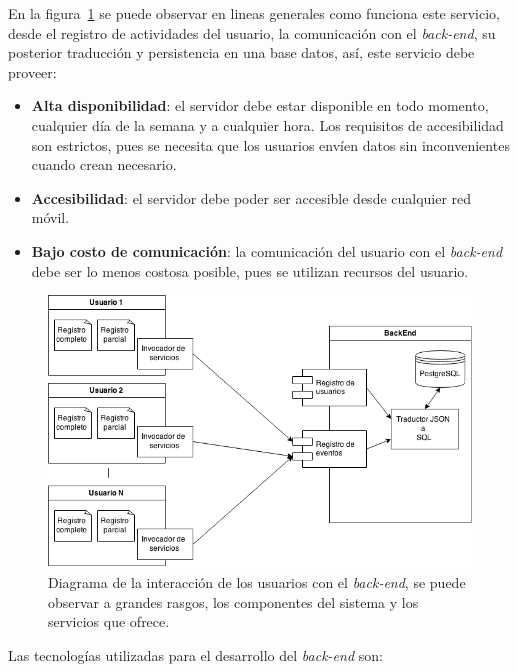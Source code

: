 En la figura~\ref{fig:backend_diagrama} se puede observar en lineas generales
como funciona este servicio, desde el registro de actividades del usuario, la
comunicación con el \textit{back-end}, su posterior traducción y persistencia en
una base datos, así, este servicio debe proveer:

\begin{itemize}
    \item \textbf{Alta disponibilidad}: el servidor debe estar disponible en
        todo momento, cualquier día de la semana y a cualquier hora. Los
        requisitos de accesibilidad son estrictos, pues se necesita que los
        usuarios envíen datos sin inconvenientes cuando crean necesario.
    \item \textbf{Accesibilidad}: el servidor debe poder ser accesible desde
        cualquier red móvil.
    \item \textbf{Bajo costo de comunicación}: la comunicación del usuario con
        el \textit{back-end} debe ser lo menos costosa posible, pues se utilizan
        recursos del usuario.
\end{itemize}

\begin{figure}[H]
\centering
\includegraphics[scale=0.5]{tecnologias/images/backend_diagrama.png}
\caption{Diagrama de la interacción de los usuarios con el \textit{back-end}, se
    puede observar a grandes rasgos, los componentes del sistema y los servicios
    que ofrece.}
\label{fig:backend_diagrama}
\end{figure}

Las tecnologías utilizadas para el desarrollo del \textit{back-end} son:

